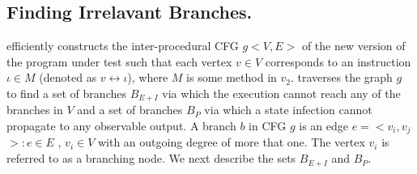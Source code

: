 %

\subsection{Finding Irrelavant Branches.}
 efficiently constructs the inter-procedural CFG $g<$$V,E$$>$ of 
the new version of the program under test such that each vertex $v \in V$ 
corresponds to an instruction $\iota \in M$ (denoted as $v \leftrightarrow \iota$), where $M$ is some method in $v_2$.  
 traverses the graph $g$ to find a set of branches $B_{E+I}$ via which the execution cannot reach any of the branches in $V$ and a set of branches $B_{P}$ via which a state infection cannot propagate to any observable output. A branch $b$ in CFG $g$ is an edge $e = <$$v_i, v_j$$>: e \in E$ , $v_i \in V$ with an outgoing degree of more that one. The vertex $v_i$ is referred to as a branching node. 
We next describe the sets $B_{E+I}$ and $B_P$.

